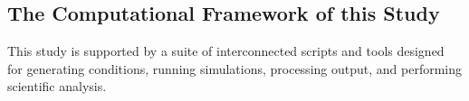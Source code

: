 
\subsection{The Computational Framework of this Study}
This study is supported by a suite of interconnected scripts and tools designed for generating conditions, running simulations, processing output, and performing scientific analysis.





